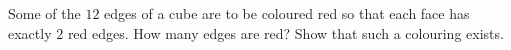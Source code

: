 Some of the $12$ edges of a cube are to be coloured red so that each face has exactly $2$ red edges. How many edges are red? Show that such a colouring exists.
